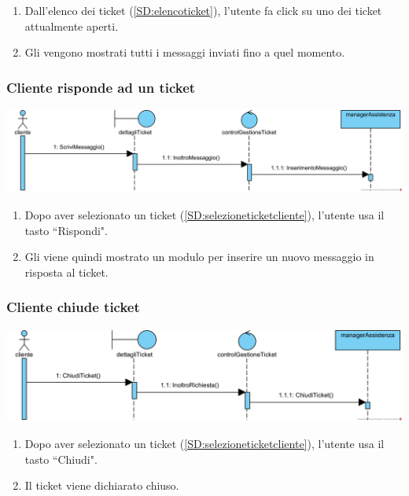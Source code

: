 \documentclass[12pt,a4paper]{article}
\begin{document}
\begin{enumerate}
\item Dall'elenco dei ticket (\ref{SD:elencoticket}), l'utente fa click su uno dei ticket attualmente aperti.
\item Gli vengono mostrati tutti i messaggi inviati fino a quel momento.
\end{enumerate}

\subsubsection{Cliente risponde ad un ticket}
\label{SD:rispostaticketcliente}

\begin{center}
\includegraphics[width=\textwidth]{SequenceDiagram/ClienteRispondeTicket}
\end{center}

\begin{enumerate}
\item Dopo aver selezionato un ticket (\ref{SD:selezioneticketcliente}), l'utente usa il tasto ``Rispondi".
\item Gli viene quindi mostrato un modulo per inserire un nuovo messaggio in risposta al ticket.
\end{enumerate}

\subsubsection{Cliente chiude ticket}
\label{SD:chiusuraticket}

\begin{center}
\includegraphics[width=\textwidth]{SequenceDiagram/ClienteChiusuraTicket}
\end{center}

\begin{enumerate}
\item Dopo aver selezionato un ticket (\ref{SD:selezioneticketcliente}), l'utente usa il tasto ``Chiudi".
\item Il ticket viene dichiarato chiuso.
\end{enumerate}
\end{document}
